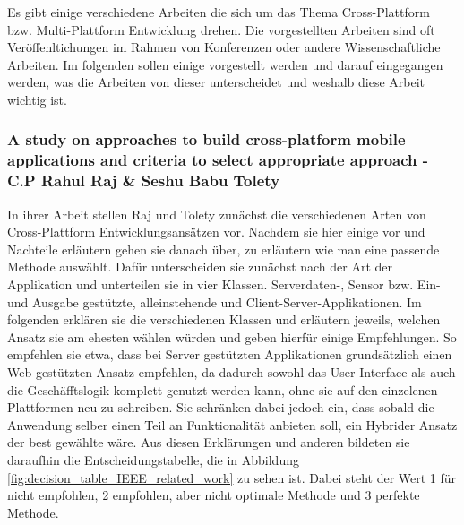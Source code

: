 Es gibt einige verschiedene Arbeiten die sich um das Thema Cross-Plattform bzw. Multi-Plattform Entwicklung drehen. Die vorgestellten Arbeiten sind oft Veröffenltichungen im Rahmen von Konferenzen oder andere Wissenschaftliche Arbeiten. Im folgenden sollen einige vorgestellt werden und darauf eingegangen werden, was die Arbeiten von dieser unterscheidet und weshalb diese Arbeit wichtig ist.

\subsubsection{A study on approaches to build cross-platform mobile applications and criteria to select appropriate approach - C.P Rahul Raj \& Seshu Babu Tolety}
In ihrer Arbeit stellen Raj und Tolety zunächst die verschiedenen Arten von Cross-Plattform Entwicklungsansätzen vor. Nachdem sie hier einige vor und Nachteile erläutern gehen sie danach über, zu erläutern wie man eine passende Methode auswählt. Dafür unterscheiden sie zunächst nach der Art der Applikation und unterteilen sie in vier Klassen. Serverdaten-, Sensor bzw. Ein-und Ausgabe gestützte, alleinstehende und Client-Server-Applikationen. Im folgenden erklären sie die verschiedenen Klassen und erläutern jeweils, welchen Ansatz sie am ehesten wählen würden und geben hierfür einige Empfehlungen. So empfehlen sie etwa, dass bei Server gestützten Applikationen grundsätzlich einen Web-gestützten Ansatz empfehlen, da dadurch sowohl das User Interface als auch die Geschäfftslogik komplett genutzt werden kann, ohne sie auf den einzelenen Plattformen neu zu schreiben. Sie schränken dabei jedoch ein, dass sobald die Anwendung selber einen Teil an Funktionalität anbieten soll, ein Hybrider Ansatz der best gewählte wäre. Aus diesen Erklärungen und anderen bildeten sie daraufhin die Entscheidungstabelle, die in Abbildung \ref{fig:decision_table_IEEE_related_work} zu sehen ist. Dabei steht der Wert 1 für nicht empfohlen, 2 empfohlen, aber nicht optimale Methode und 3 perfekte Methode.\cite{IEEE_Rahul_Seshu}

